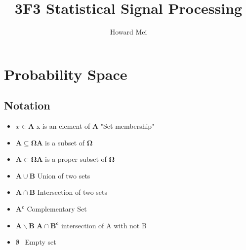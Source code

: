 \documentclass[12pt]{article}
\title{3F3 Statistical Signal Processing}
\author{Howard Mei}
\begin{document}
  \maketitle

\section{Probability Space}
\subsection{Notation}
\begin{itemize}
\item $x\in\mathbf{A}$ \qquad x is an element of $\mathbf{A}$ "Set membership"
\item $\mathbf{A\subseteq\Omega}$\qquad$\mathbf{A}$ is a subset of $\mathbf{\Omega}$
\item $\mathbf{A\subset\Omega}$\qquad$\mathbf{A}$ is a proper subset of $\mathbf{\Omega}$
\item $\mathbf{A \cup B}$ \qquad Union of two sets
\item $\mathbf{A \cap B}$ \qquad Intersection of two sets
\item $\mathbf{A^c}$ \qquad \quad \: Complementary Set
\item $\mathbf{A \backslash B}$ \qquad \: $\mathbf{A \cap B^c}$ intersection of A with not B
\item $\emptyset$ \qquad \qquad \, Empty set
\end{itemize}
\end{document}
